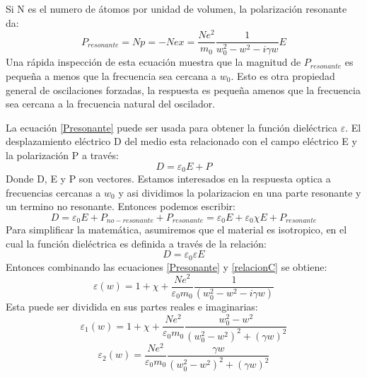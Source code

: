 \documentclass[a4paper,openright,12pt]{book}
\begin{document}
Si N es el numero de átomos por unidad de volumen, la polarización resonante da:
\begin{equation}\label{Presonante}
P_{resonante}=Np=-Nex=\frac{Ne^{2}}{m_{0}}\frac{1}{w_{0}^{2}-w^{2}-i\gamma w}E
\end{equation}
Una rápida inspección de esta ecuación muestra que la magnitud de $P_{resonante}$ es pequeña a menos que la frecuencia sea cercana a $w_{0}$. Esto es otra propiedad general de oscilaciones forzadas, la respuesta es pequeña amenos que la frecuencia sea cercana a la frecuencia natural del oscilador.

La ecuación \ref{Presonante} puede ser usada para obtener la función dieléctrica $\varepsilon$. El desplazamiento eléctrico D del medio esta relacionado con el campo eléctrico E y la polarización P a través:
\begin{equation}\label{ecuacion211}
D=\varepsilon_{0}E+P
\end{equation}
Donde D, E y P son vectores. Estamos interesados en la respuesta optica a frecuencias cercanas a $w_{0}$ y asi dividimos la polarizacion en una parte resonante y un termino no resonante. Entonces podemos escribir:
\begin{equation}\label{ecuacion212}
D=\varepsilon_{0}E+P_{no-resonante}+P_{resonante}=\varepsilon_{0}E+\varepsilon_{0}\chi E+P_{resonante}
\end{equation}
Para simplificar la matemática, asumiremos que el material es isotropico, en el cual la función dieléctrica es definida a través de la relación:
\begin{equation}\label{relacionC}
D=\varepsilon_{0}\varepsilon E
\end{equation}
Entonces combinando las ecuaciones \ref{Presonante} y \ref{relacionC} se obtiene:
\begin{equation}
\varepsilon(w)=1+\chi +\frac{N e^{2}}{\varepsilon_{0}m_{0}}\frac{1}{(w_{0}^{2}-w^{2}-i\gamma w)}
\end{equation}
Esta puede ser dividida en sus partes reales e imaginarias:
\begin{equation}\label{var1lorentz}
\varepsilon_{1}(w)=1+\chi+\frac{Ne^{2}}{\varepsilon_{0}m_{0}}\frac{w_{0}^{2}-w^{2}}{(w_{0}^{2}-w^{2})^{2}+(\gamma w)^{2}}
\end{equation}
\begin{equation}\label{var2lorentz}
\varepsilon_{2}(w)=\frac{Ne^{2}}{\varepsilon_{0}m_{0}}\frac{\gamma w}{(w_{0}^{2}-w^{2})^{2}+(\gamma w)^{2}}
\end{equation}
\end{document}
